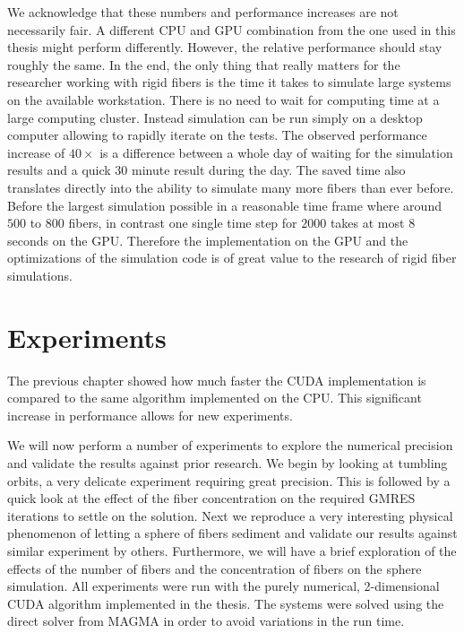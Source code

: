 \documentclass[a4paper,11pt]{kth-mag}
\begin{document}
We acknowledge that these numbers and performance increases are not necessarily fair. A different CPU and GPU combination from the one used in this thesis might perform differently. However, the relative performance should stay roughly the same. In the end, the only thing that really matters for the researcher working with rigid fibers is the time it takes to simulate large systems on the available workstation. There is no need to wait for computing time at a large computing cluster. Instead simulation can be run simply on a desktop computer allowing to rapidly iterate on the tests. The observed performance increase of $40×$ is a difference between a whole day of waiting for the simulation results and a quick $30$ minute result during the day. The saved time also translates directly into the ability to simulate many more fibers than ever before. Before the largest simulation possible in a reasonable time frame where around $500$ to $800$ fibers, in contrast one single time step for $2000$ takes at most $8$ seconds on the GPU. Therefore the implementation on the GPU and the optimizations of the simulation code is of great value to the research of rigid fiber simulations.

\chapter{Experiments}
\label{cha:experiments}

The previous chapter showed how much faster the CUDA implementation is compared to the same algorithm implemented on the CPU. This significant increase in performance allows for new experiments.

We will now perform a number of experiments to explore the numerical precision and validate the results against prior research. We begin by looking at tumbling orbits, a very delicate experiment requiring great precision. This is followed by a quick look at the effect of the fiber concentration on the required GMRES iterations to settle on the solution. Next we reproduce a very interesting physical phenomenon of letting a sphere of fibers sediment and validate our results against similar experiment by others. Furthermore, we will have a brief exploration of the effects of the number of fibers and the concentration of fibers on the sphere simulation. All experiments were run with the purely numerical, 2-dimensional CUDA algorithm  implemented in the thesis. The systems were solved using the direct solver from MAGMA in order to avoid variations in the run time.
\end{document}
